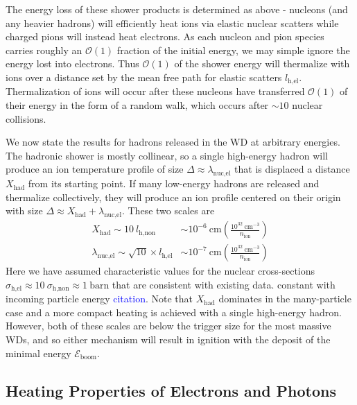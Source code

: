 \documentclass[twocolumn,showpacs,preprintnumbers,amsmath,amssymb,prd]{revtex4}
\newcommand{\Eboom}{\mathcal{E}_\text{boom}}
\newcommand{\OO}{\mathcal{O}}
\def\r{\right)}
\def\l{\left(}
\begin{document}
The energy loss of these shower products is determined as above - nucleons (and any heavier hadrons) will efficiently heat ions via elastic nuclear scatters while charged pions will instead heat electrons. 
As each nucleon and pion species carries roughly an $\OO(1)$ fraction of the initial energy, we may simple ignore the energy lost into electrons.
Thus $\OO(1)$ of the shower energy will thermalize with ions over a distance set by the mean free path for elastic scatters $ l_\text{h,el}$. 
Thermalization of ions will occur after these nucleons have transferred $\OO(1)$ of their energy in the form of a random walk, which occurs after $\sim 10$ nuclear collisions. 


We now state the results for hadrons released in the WD at arbitrary energies. The hadronic shower is mostly collinear, so a single high-energy hadron will produce an ion temperature profile of size $\Delta \approx\lambda_\text{nuc,el}$ that is displaced a distance $X_\text{had}$ from its starting point. 
If many low-energy hadrons are released and thermalize collectively, they will produce an ion profile centered on their origin with size $\Delta \approx X_\text{had} + \lambda_\text{nuc,el}$.
These two scales are
\begin{align}
  X_\text{had} \sim 10 ~l_\text{h,non}
  &\sim 10^{-6} ~\text{cm} \l\frac{10^{32}~\text{cm}^{-3}}{n_\text{ion}}\r \\ 
  \lambda_\text{nuc,el} \sim \sqrt{10} \times l_\text{h,el}  
  &\sim  10^{-7} ~\text{cm} \l\frac{10^{32}~\text{cm}^{-3}}{n_\text{ion}}\r
\end{align}
Here we have assumed characteristic values for the nuclear cross-sections $\sigma_\text{h,el} \approx 10~\sigma_\text{h,non} \approx 1~\text{barn}$ that are consistent with existing data. constant with incoming particle energy \textcolor{blue}{citation}.
Note that $X_\text{had}$ dominates in the many-particle case and a more compact heating is achieved with a single high-energy hadron. 
However, both of these scales are below the trigger size for the most massive WDs, and so either mechanism will result in ignition with the deposit of the minimal energy $\Eboom$. 



\subsection{Heating Properties of Electrons and Photons}
\end{document}
